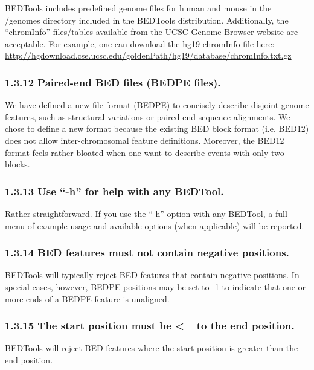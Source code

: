 \documentclass[letterpaper,10pt,english]{sphinxmanual}
\begin{document}
BEDTools includes predefined genome files for human and mouse in the /genomes directory included
in the BEDTools distribution. Additionally, the “chromInfo” files/tables available from the UCSC
Genome Browser website are acceptable. For example, one can download the hg19 chromInfo file here:
\href{http://hgdownload.cse.ucsc.edu/goldenPath/hg19/database/chromInfo.txt.gz}{http://hgdownload.cse.ucsc.edu/goldenPath/hg19/database/chromInfo.txt.gz}


\subsubsection{1.3.12 Paired-end BED files (BEDPE files).}
\label{content/overview:paired-end-bed-files-bedpe-files}
We have defined a new file format (BEDPE) to concisely describe disjoint genome features, such as
structural variations or paired-end sequence alignments. We chose to define a new format because the
existing BED block format (i.e. BED12) does not allow inter-chromosomal feature definitions. Moreover,
the BED12 format feels rather bloated when one want to describe events with only two blocks.


\subsubsection{1.3.13 Use “-h” for help with any BEDTool.}
\label{content/overview:use-h-for-help-with-any-bedtool}
Rather straightforward. If you use the “-h” option with any BEDTool, a full menu of example usage
and available options (when applicable) will be reported.


\subsubsection{1.3.14 BED features must not contain negative positions.}
\label{content/overview:bed-features-must-not-contain-negative-positions}
BEDTools will typically reject BED features that contain negative positions. In special cases, however,
BEDPE positions may be set to -1 to indicate that one or more ends of a BEDPE feature is unaligned.


\subsubsection{1.3.15 The start position must be \textless{}= to the end position.}
\label{content/overview:the-start-position-must-be-to-the-end-position}
BEDTools will reject BED features where the start position is greater than the end position.
\end{document}
